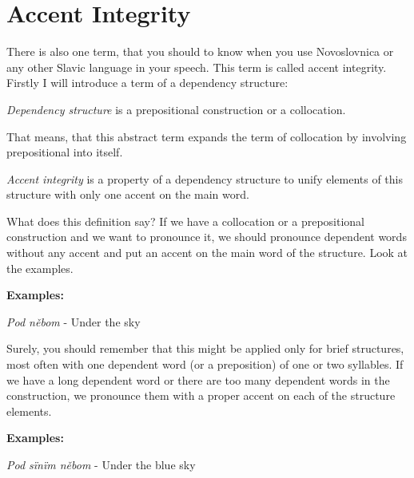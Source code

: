 \section{Accent Integrity}

There is also one term, that you should to know when you use Novoslovnica or any other Slavic language in your speech. This term is called accent integrity. Firstly I will introduce a term of a dependency structure:

\textit{Dependency structure} is a prepositional construction or a collocation.

That means, that this abstract term expands the term of collocation by involving prepositional into itself. 

\textit{Accent integrity} is a property of a dependency structure to unify elements of this structure with only one accent on the main word.

What does this definition say? If we have a collocation or a prepositional construction and we want to pronounce it, we should pronounce dependent words without any accent and put an accent on the main word of the structure. Look at the examples.

\textbf{Examples:}

\textit{Pod něbom} \textipa{[p@d 'nIbom ]} - Under the sky

Surely, you should remember that this might be applied only for brief structures, most often with one dependent word (or a preposition) of one or two syllables. If we have a long dependent word or there are too many dependent words in the construction, we pronounce them with a proper accent on each of the structure elements.

\textbf{Examples:}

\textit{Pod sïnïm něbom}  - Under the blue sky
